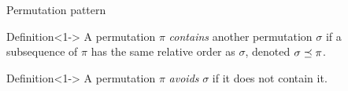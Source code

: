 \begin{frame}{Permutation pattern}
    \begin{block}{Definition}<1->
    A permutation $\pi$ \emph{contains} another permutation $\sigma$ if a subsequence of $\pi$ has the same relative order as $\sigma$, denoted $\sigma \preceq \pi$.
    \end{block}
    \begin{block}{Definition}<1->
    A permutation $\pi$ \emph{avoids} $\sigma$ if it does not contain it.
    \end{block}
    \addtocounter{figure}{1}
\end{frame}